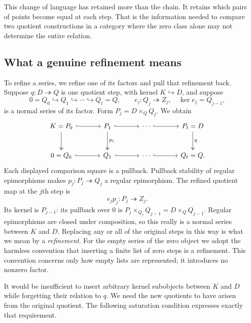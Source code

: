 \documentclass[11pt]{article}
\theoremstyle{definition}
\theoremstyle{remark}\newtheorem{remark}[theorem]{Remark}
\begin{document}
This change of language has retained more than the chain.  It retains
which pairs of points become equal at each step.  That is the information
needed to compare two quotient constructions in a category where the zero
class alone may not determine the entire relation.

\subsection{What a genuine refinement means}

To refine a series, we refine one of its factors and pull that refinement
back.  Suppose $q:D\twoheadrightarrow Q$ is one quotient step, with kernel
$K\hookrightarrow D$, and suppose
\[
 0=Q_0\hookrightarrow Q_1\hookrightarrow\cdots\hookrightarrow Q_t=Q,
 \qquad e_j:Q_j\twoheadrightarrow Z_j,\quad\ker e_j=Q_{j-1},
\]
is a normal series of its factor.  Form $P_j=D\times_Q Q_j$.  We obtain
\[
\begin{tikzcd}[column sep=large,row sep=large]
K=P_0\arrow[r,hook]\arrow[d,two heads]
 &P_1\arrow[r,hook]\arrow[d,two heads,"p_1"]
 &\cdots\arrow[r,hook]&P_t=D\arrow[d,two heads,"q"]\\
0=Q_0\arrow[r,hook]&Q_1\arrow[r,hook]
 &\cdots\arrow[r,hook]&Q_t=Q .
\end{tikzcd}
\]
Each displayed comparison square is a pullback.  Pullback stability of
regular epimorphisms makes $p_j:P_j\twoheadrightarrow Q_j$ a regular
epimorphism.  The refined quotient map at the $j$th step is
\begin{equation}
\label{r:refined-map}
                  e_jp_j:P_j\twoheadrightarrow Z_j.
\end{equation}
Its kernel is $P_{j-1}$: its pullback over $0$ is
$P_j\times_{Q_j}Q_{j-1}=D\times_Q Q_{j-1}$.  Regular epimorphisms are
closed under composition, so this really is a normal series between $K$
and $D$.  Replacing any or all of the original steps in this way is what
we mean by a \emph{refinement}.
For the empty series of the zero object we adopt the harmless convention
that inserting a finite list of zero steps is a refinement.  This
convention concerns only how empty lists are represented; it introduces
no nonzero factor.

It would be insufficient to insert arbitrary kernel subobjects between
$K$ and $D$ while forgetting their relation to $q$.  We need the new
quotients to have arisen from the original quotient.  The following
saturation condition expresses exactly that requirement.
\end{document}

